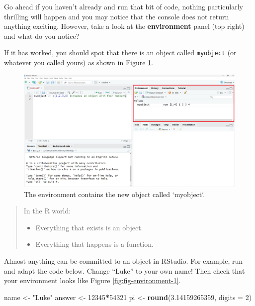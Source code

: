 \documentclass[
]{book}
\newenvironment{Shaded}{\begin{snugshade}}{\end{snugshade}}
\newcommand{\AttributeTok}[1]{\textcolor[rgb]{0.13,0.29,0.53}{#1}}
\newcommand{\DecValTok}[1]{\textcolor[rgb]{0.00,0.00,0.81}{#1}}
\newcommand{\FloatTok}[1]{\textcolor[rgb]{0.00,0.00,0.81}{#1}}
\newcommand{\FunctionTok}[1]{\textcolor[rgb]{0.13,0.29,0.53}{\textbf{#1}}}
\newcommand{\NormalTok}[1]{#1}
\newcommand{\OtherTok}[1]{\textcolor[rgb]{0.56,0.35,0.01}{#1}}
\newcommand{\SpecialCharTok}[1]{\textcolor[rgb]{0.81,0.36,0.00}{\textbf{#1}}}
\newcommand{\StringTok}[1]{\textcolor[rgb]{0.31,0.60,0.02}{#1}}
\begin{document}
Go ahead if you haven't already and run that bit of code, nothing particularly thrilling will happen and you may notice that the console does not return anything exciting. However, take a look at the \textbf{environment} panel (top right) and what do you notice?

If it has worked, you should spot that there is an object called \texttt{myobject} (or whatever you called yours) as shown in Figure \ref{fig:fig-environment}.

\begin{figure}[H]

{\centering \includegraphics[width=1\linewidth]{images/object} 

}

\caption{The environment contains the new object called `myobject`.}\label{fig:fig-environment}
\end{figure}

\begin{quote}
In the R world:

\begin{itemize}
\item
  Everything that exists is an object.
\item
  Everything that happens is a function.
\end{itemize}
\end{quote}

Almost anything can be committed to an object in RStudio. For example, run and adapt the code below. Change ``Luke'' to your own name! Then check that your environment looks like Figure \ref{fig:fig-environment-1}.

\begin{Shaded}
\begin{Highlighting}[]
\NormalTok{name }\OtherTok{\textless{}{-}} \StringTok{"Luke"}
\NormalTok{answer }\OtherTok{\textless{}{-}} \DecValTok{12345}\SpecialCharTok{*}\DecValTok{54321}
\NormalTok{pi }\OtherTok{\textless{}{-}} \FunctionTok{round}\NormalTok{(}\FloatTok{3.14159265359}\NormalTok{, }\AttributeTok{digits =} \DecValTok{2}\NormalTok{)}
\end{Highlighting}
\end{Shaded}
\end{document}
